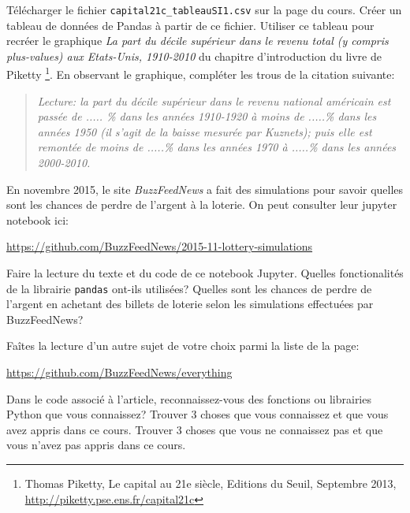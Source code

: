 \begin{exercice}
Télécharger le fichier \texttt{capital21c\_tableauSI1.csv} sur la page du cours.
Créer un tableau de données de Pandas à partir de ce fichier. 
Utiliser ce tableau pour recréer le
graphique \emph{La part du décile supérieur dans le revenu total (y compris
plus-values) aux Etats-Unis, 1910-2010}
du chapitre d'introduction du livre de Piketty
\footnote{Thomas Piketty,
Le capital au 21e siècle,
Editions du Seuil, Septembre 2013, \url{http://piketty.pse.ens.fr/capital21c}}.
En observant le graphique, compléter les trous de la citation suivante:
\begin{quote}
\it
Lecture: la part du décile supérieur dans le revenu national américain est
passée de ..... \% dans les années 1910-1920 à moins de .....\% dans les années 1950
(il s'agit de la baisse mesurée par Kuznets); puis elle est remontée de moins de
.....\% dans les années 1970 à .....\% dans les années 2000-2010.
\end{quote}
\end{exercice}


\begin{exercice}[La lotterie]
En novembre 2015, le site \emph{BuzzFeedNews} a fait des simulations pour savoir
quelles sont les chances de perdre de l'argent à la loterie. On peut consulter
leur jupyter notebook ici:
\begin{center}
\url{https://github.com/BuzzFeedNews/2015-11-lottery-simulations}
\end{center}
Faire la lecture du texte et du code de ce notebook Jupyter.
Quelles fonctionalités de la librairie \texttt{pandas} ont-ils utilisées?
Quelles sont les chances de perdre de l'argent en achetant des billets de
loterie selon les simulations effectuées par BuzzFeedNews?
\end{exercice}

\begin{exercice}[BuzzFeedNews]
Faîtes la lecture d'un autre sujet de votre choix parmi la liste de la page:
\begin{center}
\url{https://github.com/BuzzFeedNews/everything}
\end{center}
Dans le code associé à l'article, reconnaissez-vous des fonctions ou librairies
Python que vous connaissez? Trouver 3 choses que vous connaissez et que vous
avez appris dans ce cours. Trouver 3 choses que vous ne connaissez pas et que
vous n'avez pas appris dans ce cours.
\end{exercice}

